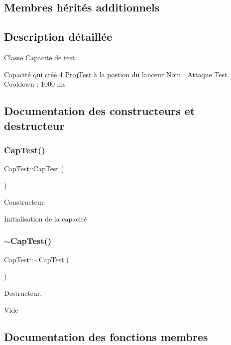 \subsection*{Membres hérités additionnels}


\subsection{Description détaillée}
Classe Capacité de test. 

Capacité qui créé 4 \hyperlink{class_proj_test}{Proj\+Test} à la postion du lanceur Nom \+: Attaque Test Cooldown \+: 1000 ms 

\subsection{Documentation des constructeurs et destructeur}
\mbox{\label{class_cap_test_a5f6d4b172a6a40f974b3f7414e3f06e5}} 
\subsubsection{\texorpdfstring{Cap\+Test()}{CapTest()}}
{\footnotesize\ttfamily Cap\+Test\+::\+Cap\+Test (\begin{DoxyParamCaption}{ }\end{DoxyParamCaption})}



Constructeur. 

Initialisation de la capacité \mbox{\label{class_cap_test_a92687aa212347d1738e7736cb107d03b}} 
\subsubsection{\texorpdfstring{$\sim$\+Cap\+Test()}{~CapTest()}}
{\footnotesize\ttfamily Cap\+Test\+::$\sim$\+Cap\+Test (\begin{DoxyParamCaption}{ }\end{DoxyParamCaption})}



Destructeur. 

Vide 

\subsection{Documentation des fonctions membres}
\mbox{\label{class_cap_test_a082e76e397a400b9c46e13e63ac7ef85}} 
